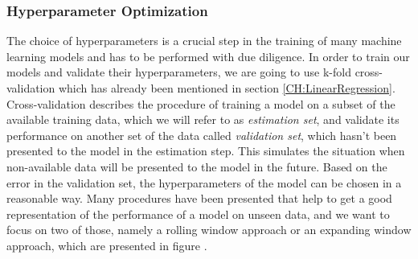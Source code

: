 \subsubsection{Hyperparameter Optimization}
The choice of hyperparameters is a crucial step in the training of many machine learning models and has to be performed with due diligence.
In order to train our models and validate their hyperparameters, we are going to use k-fold cross-validation which has already been mentioned in section \ref{CH:LinearRegression}. Cross-validation describes the procedure of training a model on a subset of the available training data, which we will refer to as \textit{estimation set}, and validate its performance on another set of the data called \textit{validation set}, which hasn't been presented to the model in the estimation step. This simulates the situation when non-available data will be presented to the model in the future. Based on the error in the validation set, the hyperparameters of the model can be chosen in a reasonable way.
Many procedures have been presented that help to get a good representation of the performance of a model on unseen data, and we want to focus on two of those, namely a rolling window approach or an expanding window approach, which are presented in figure .



